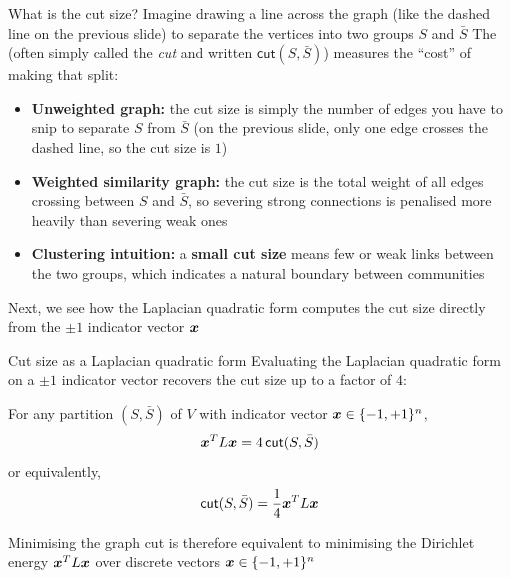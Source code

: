 \documentclass[aspectratio=169]{beamer}\usepackage[]{graphicx}\usepackage[]{xcolor}
\begin{document}
\begin{frame}{What is the cut size?}
Imagine drawing a line across the graph (like the dashed line on the previous slide) to separate the vertices into two groups $S$ and $\bar{S}$
\vfill
The  (often simply called the \emph{cut} and written $\mathsf{cut}(S, \bar{S})$) measures the ``cost'' of making that split:
\begin{itemize}
\item \textbf{Unweighted graph:} the cut size is simply the number of edges you have to snip to separate $S$ from $\bar{S}$ (on the previous slide, only one edge crosses the dashed line, so the cut size is $1$)
\vfill
\item \textbf{Weighted similarity graph:} the cut size is the total weight of all edges crossing between $S$ and $\bar{S}$, so severing strong connections is penalised more heavily than severing weak ones
\vfill
\item \textbf{Clustering intuition:} a \textbf{small cut size} means few or weak links between the two groups, which indicates a natural boundary between communities
\end{itemize}
\vfill
Next, we see how the Laplacian quadratic form computes the cut size directly from the $\pm 1$ indicator vector $\bm{x}$
\end{frame}


\begin{frame}{Cut size as a Laplacian quadratic form}
Evaluating the Laplacian quadratic form on a $\pm 1$ indicator vector recovers the cut size up to a factor of $4$:
\vfill
\begin{importantproposition}
\label{prop:cut-quadratic-form}
For any partition $(S, \bar{S})$ of $V$ with indicator vector $\bm{x} \in \{-1, +1\}^n$,
\[
\bm{x}^T L \bm{x} = 4\,\mathsf{cut}(S, \bar{S})
\]
or equivalently,
\[
\mathsf{cut}(S, \bar{S}) = \frac{1}{4}\bm{x}^T L \bm{x}
\]
\end{importantproposition}
\vfill
Minimising the graph cut is therefore equivalent to minimising the Dirichlet energy $\bm{x}^T L \bm{x}$ over discrete vectors $\bm{x} \in \{-1, +1\}^n$
\end{frame}
\end{document}
